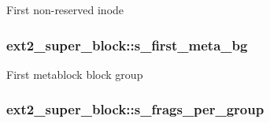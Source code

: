 First non-\/reserved inode \hypertarget{structext2__super__block_a436c7c8af548ade7f8045e88c2861d61}{
\subsubsection[{s\+\_\+first\+\_\+meta\+\_\+bg}]{ ext2\+\_\+super\+\_\+block\+::s\+\_\+first\+\_\+meta\+\_\+bg}}\label{structext2__super__block_a436c7c8af548ade7f8045e88c2861d61}
First metablock block group \hypertarget{structext2__super__block_a6370cd7307aa833951c40fcc3f941b61}{
\subsubsection[{s\+\_\+frags\+\_\+per\+\_\+group}]{ ext2\+\_\+super\+\_\+block\+::s\+\_\+frags\+\_\+per\+\_\+group}}\label{structext2__super__block_a6370cd7307aa833951c40fcc3f941b61}
